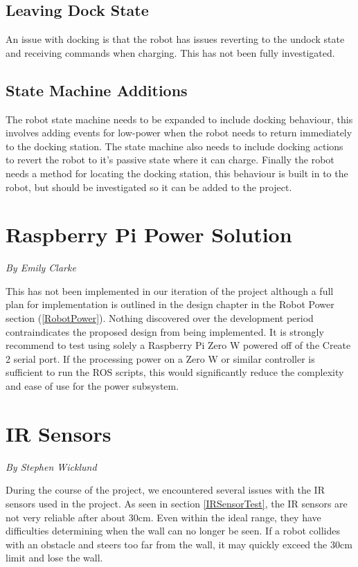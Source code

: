\documentclass[12pt]{report}
\newcommand{\sectionAuthor}[1]{{\small\vspace{-1em}\textit{#1}}\bigskip\par}
\begin{document}
\subsection{Leaving Dock State}
An issue with docking is that the robot has issues reverting to the undock state and receiving commands when charging. This has not been fully investigated.
\subsection{State Machine Additions}
The robot state machine needs to be expanded to include docking behaviour, this involves adding events for low-power when the robot needs to return immediately to the docking station. The state machine also needs to include docking actions to revert the robot to it's passive state where it can charge. Finally the robot needs a method for locating the docking station, this behaviour is built in to the robot, but should be investigated so it can be added to the project.

\section{Raspberry Pi Power Solution}
\sectionAuthor{By Emily Clarke}
This has not been implemented in our iteration of the project although a full plan for implementation is outlined in the design chapter in the Robot Power section (\ref{RobotPower}). Nothing discovered over the development period contraindicates the proposed design from being implemented. 
It is strongly recommend to test using solely a Raspberry Pi Zero W powered off of the Create 2 serial port. If the processing power on a Zero W or similar controller is sufficient to run the ROS scripts, this would significantly reduce the complexity and ease of use for the power subsystem. 

\section{IR Sensors}
\sectionAuthor{By Stephen Wicklund}
During the course of the project, we encountered several issues with the IR sensors used in the project. As seen in section \ref{IRSensorTest}, the IR sensors are not very reliable after about 30cm. Even within the ideal range, they have difficulties determining when the wall can no longer be seen. If a robot collides with an obstacle and steers too far from the wall, it may quickly exceed the 30cm limit and lose the wall.
\end{document}
